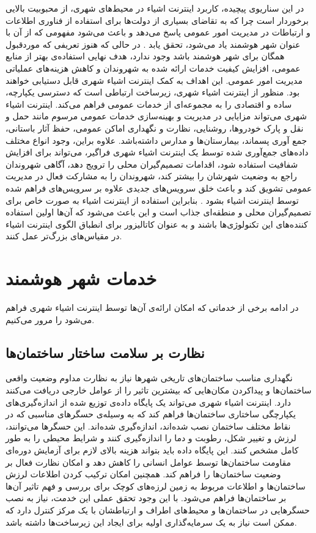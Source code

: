     در این سناریوی پیچیده، کاربرد اینترنت اشیاء در محیط‌های شهری، از محبوبیت بالایی برخوردار است چرا که به تقاضای بسیاری از دولت‌ها برای استفاده از فناوری‌ اطلاعات و ارتباطات در مدیریت امور عمومی پاسخ می‌دهد و باعث می‌شود مفهومی که از آن با عنوان شهر هوشمند یاد می‌شود، تحقق یابد \cite{schaffers2011smart}.
    در حالی که هنوز تعریفی که موردقبول همگان برای شهر هوشمند باشد وجود ندارد، هدف نهایی استفاده‌ی بهتر از منابع عمومی، افزایش کیفیت خدمات ارائه شده به شهروندان و کاهش هزینه‌های عملیاتی مدیریت امور عمومی.
    این اهداف به کمک اینترنت اشیاء شهری قابل دستیابی خواهند بود.
    منظور از اینترنت اشیاء شهری، زیرساخت ارتباطی است که دسترسی یکپارچه، ساده و اقتصادی را به مجموعه‌ای از خدمات عمومی فراهم می‌کند.
    اینترنت اشیاء شهری می‌تواند مزایایی در مدیریت و بهینه‌سازی خدمات عمومی مرسوم مانند حمل و نقل و پارک خودرو‌ها، روشنایی، نظارت و نگهداری اماکن عمومی، حفظ آثار باستانی، جمع آوری پسماند، بیمارستان‌ها و مدارس داشته‌باشد.
    علاوه براین، وجود انواع مختلف داده‌های جمع‌آوری شده توسط یک اینترنت اشیاء شهری فراگیر، می‌تواند برای افزایش شفافیت استفاده شود، اقدامات تصمیم‌گیران محلی را ترویج دهد، آگاهی شهروندان راجع به وضعیت شهرشان را بیشتر کند، شهروندان را به مشارکت فعال در مدیریت عمومی تشویق کند و باعث خلق سرویس‌های جدیدی علاوه بر سرویس‌های فراهم شده توسط اینترنت اشیاء بشود \cite{cuff2008urban}.
    بنابراین استفاده از اینترنت اشیاء به صورت خاص برای تصمیم‌گیران محلی و منطقه‌ای جذاب است و این باعث می‌شود که آن‌ها اولین استفاده کننده‌های این تکنولوژی‌ها باشند و به عنوان کاتالیزور برای انطباق الگوی اینترنت اشیاء در مقیاس‌های بزرگ‌تر عمل کنند.

    \section{خدمات شهر هوشمند}
    در ادامه برخی از خدماتی که امکان ارائه‌ی آن‌ها توسط اینترنت اشیاء شهری فراهم می‌شود را مرور می‌کنیم.
    \subsection{نظارت بر سلامت ساختار ساختمان‌ها}
      نگهداری مناسب ساختمان‌های تاریخی شهر‌ها نیاز به نظارت مداوم وضعیت واقعی ساختمان‌ها و پیدا‌کردن‌ مکان‌هایی که بیشترین تاثیر را از عوامل خارجی دریافت می‌کنند دارد.
      اینترنت اشیاء شهری می‌تواند یک پایگاه داده‌ی توزیع شده از اندازه‌گیری‌های یکپارچگی ساختاری ساختمان‌ها فراهم ‌کند که به وسیله‌ی حسگر‌های مناسبی که در نقاط مختلف ساختمان نصب شده‌اند، اندازه‌گیری شده‌اند.
      این حسگر‌ها می‌توانند، لرزش و تغییر شکل، رطوبت و دما را اندازه‌گیری کنند و شرایط محیطی را به طور کامل مشخص کنند\cite{lynch2006summary}.
      این پایگاه داده باید بتواند هزینه بالای لازم برای آزمایش دوره‌ای مقاومت ساختمان‌ها توسط عوامل انسانی را کاهش دهد و امکان نظارت فعال بر وضعیت ساختمان‌ها را فراهم کند.
      همچنین امکان ترکیب کردن اطلاعات لرزش ساختمان‌ها و اطلاعات مربوط به زمین لرزه‌های کوچک برای بررسی و فهم تاثیر آن‌ها بر ساختمان‌ها فراهم می‌شود.
      با این وجود تحقق عملی این خدمت، نیاز به نصب حسگر‌هایی در ساختمان‌ها و محیط‌های اطراف و ارتباطشان با یک مرکز کنترل دارد که ممکن است نیاز به یک سرمایه‌گذاری اولیه برای ایجاد این زیرساخت‌ها داشته باشد.

